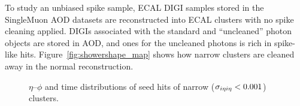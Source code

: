 To study an unbiased spike sample, ECAL DIGI samples stored in the SingleMuon AOD datasets are reconstructed into ECAL clusters with no spike cleaning applied. 
DIGIs associated with the standard and ``uncleaned'' photon objects are stored in AOD, and ones for the uncleaned photons is rich in spike-like hits. 
Figure~\ref{fig:showershape_map} shows how narrow clusters are cleaned away in the normal reconstruction.

\begin{figure}[htbp]
  \centering
  \caption{
    $\eta$--$\phi$ and time distributions of seed hits of narrow ($\sigma_{i\eta i\eta} < 0.001$) clusters.
  }
  \label{fig:spike_distributions}
\end{figure}

